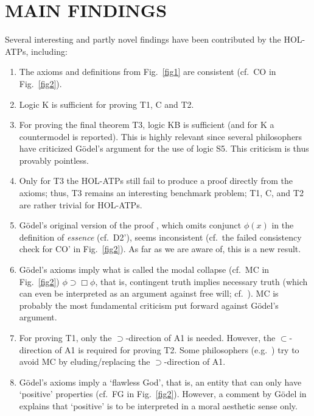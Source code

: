 \documentclass{ecai2014}
\begin{document}
{\section{MAIN FINDINGS} \label{sec4}
Several interesting and partly novel findings have been contributed by the HOL-ATPs, including:
\begin{enumerate}
\item The axioms and definitions from Fig.~\ref{fig1} are consistent (cf.~CO in Fig.~\ref{fig2}). 
\item Logic K is sufficient for proving T1, C and T2.
\item For proving the final theorem T3, logic KB is sufficient (and
  for K a countermodel is reported). This is highly relevant since
  several philosophers have criticized G{\"o}del's argument for the
  use of logic S5. This criticism is thus provably pointless.
\item Only for T3 the HOL-ATPs still fail to produce a proof directly
  from the axioms; thus, T3 remains an interesting benchmark problem; T1, C, and T2 are rather trivial for HOL-ATPs.
\item G\"odel's original version of the proof \cite{GoedelNotes},
  which omits conjunct $\phi(x)$ in the definition of \emph{essence} (cf.~D2'),
  seems inconsistent (cf.~the failed consistency check for CO' in
  Fig.~\ref{fig2}). As far as we are aware of, this is a new result.
\item G{\"o}del's axioms imply what is called the modal collapse (cf.~MC
  in Fig.~\ref{fig2}) $\phi\supset\Box\phi$, that is, contingent truth
  implies necessary truth (which can even be interpreted as an
  argument against free will; cf.~\cite{sobel2004logic}). MC is probably the most fundamental
  criticism put forward against G{\"o}del's argument.
\item For proving T1, only the $\supset$-direction of A1 is
  needed. However, the $\subset$-direction of A1 is required for
  proving T2. Some philosophers (e.g.~\cite{anderson90:_some_emend_of_goedel_ontol_proof}) try to avoid MC by
  eluding/replacing the $\supset$-direction of A1.
\item G{\"o}del's axioms imply a `flawless God', that is, an entity
  that can only have `positive' properties (cf.~FG in
  Fig.~\ref{fig2}). However, a comment by G{\"o}del in \cite{GoedelNotes}
  explains that `positive' is to be interpreted in a moral aesthetic
  sense only.

\end{enumerate}}
\end{document}
